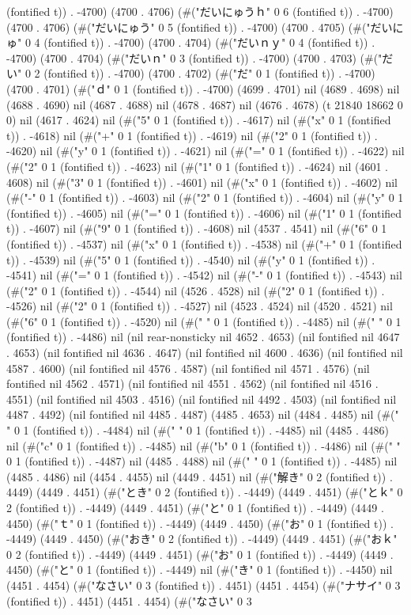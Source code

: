 (fontified t)) . -4700) (4700 . 4706) (#("だいにゅうｈ" 0 6 (fontified t)) . -4700) (4700 . 4706) (#("だいにゅう" 0 5 (fontified t)) . -4700) (4700 . 4705) (#("だいにゅ" 0 4 (fontified t)) . -4700) (4700 . 4704) (#("だいｎｙ" 0 4 (fontified t)) . -4700) (4700 . 4704) (#("だいｎ" 0 3 (fontified t)) . -4700) (4700 . 4703) (#("だい" 0 2 (fontified t)) . -4700) (4700 . 4702) (#("だ" 0 1 (fontified t)) . -4700) (4700 . 4701) (#("ｄ" 0 1 (fontified t)) . -4700) (4699 . 4701) nil (4689 . 4698) nil (4688 . 4690) nil (4687 . 4688) nil (4678 . 4687) nil (4676 . 4678) (t 21840 18662 0 0) nil (4617 . 4624) nil (#("5" 0 1 (fontified t)) . -4617) nil (#("x" 0 1 (fontified t)) . -4618) nil (#("+" 0 1 (fontified t)) . -4619) nil (#("2" 0 1 (fontified t)) . -4620) nil (#("y" 0 1 (fontified t)) . -4621) nil (#("=" 0 1 (fontified t)) . -4622) nil (#("2" 0 1 (fontified t)) . -4623) nil (#("1" 0 1 (fontified t)) . -4624) nil (4601 . 4608) nil (#("3" 0 1 (fontified t)) . -4601) nil (#("x" 0 1 (fontified t)) . -4602) nil (#("-" 0 1 (fontified t)) . -4603) nil (#("2" 0 1 (fontified t)) . -4604) nil (#("y" 0 1 (fontified t)) . -4605) nil (#("=" 0 1 (fontified t)) . -4606) nil (#("1" 0 1 (fontified t)) . -4607) nil (#("9" 0 1 (fontified t)) . -4608) nil (4537 . 4541) nil (#("6" 0 1 (fontified t)) . -4537) nil (#("x" 0 1 (fontified t)) . -4538) nil (#("+" 0 1 (fontified t)) . -4539) nil (#("5" 0 1 (fontified t)) . -4540) nil (#("y" 0 1 (fontified t)) . -4541) nil (#("=" 0 1 (fontified t)) . -4542) nil (#("-" 0 1 (fontified t)) . -4543) nil (#("2" 0 1 (fontified t)) . -4544) nil (4526 . 4528) nil (#("2" 0 1 (fontified t)) . -4526) nil (#("2" 0 1 (fontified t)) . -4527) nil (4523 . 4524) nil (4520 . 4521) nil (#("6" 0 1 (fontified t)) . -4520) nil (#(" " 0 1 (fontified t)) . -4485) nil (#(" " 0 1 (fontified t)) . -4486) nil (nil rear-nonsticky nil 4652 . 4653) (nil fontified nil 4647 . 4653) (nil fontified nil 4636 . 4647) (nil fontified nil 4600 . 4636) (nil fontified nil 4587 . 4600) (nil fontified nil 4576 . 4587) (nil fontified nil 4571 . 4576) (nil fontified nil 4562 . 4571) (nil fontified nil 4551 . 4562) (nil fontified nil 4516 . 4551) (nil fontified nil 4503 . 4516) (nil fontified nil 4492 . 4503) (nil fontified nil 4487 . 4492) (nil fontified nil 4485 . 4487) (4485 . 4653) nil (4484 . 4485) nil (#(" " 0 1 (fontified t)) . -4484) nil (#(" " 0 1 (fontified t)) . -4485) nil (4485 . 4486) nil (#("c" 0 1 (fontified t)) . -4485) nil (#("b" 0 1 (fontified t)) . -4486) nil (#(" " 0 1 (fontified t)) . -4487) nil (4485 . 4488) nil (#(" " 0 1 (fontified t)) . -4485) nil (4485 . 4486) nil (4454 . 4455) nil (4449 . 4451) nil (#("解き" 0 2 (fontified t)) . 4449) (4449 . 4451) (#("とき" 0 2 (fontified t)) . -4449) (4449 . 4451) (#("とｋ" 0 2 (fontified t)) . -4449) (4449 . 4451) (#("と" 0 1 (fontified t)) . -4449) (4449 . 4450) (#("ｔ" 0 1 (fontified t)) . -4449) (4449 . 4450) (#("お" 0 1 (fontified t)) . -4449) (4449 . 4450) (#("おき" 0 2 (fontified t)) . -4449) (4449 . 4451) (#("おｋ" 0 2 (fontified t)) . -4449) (4449 . 4451) (#("お" 0 1 (fontified t)) . -4449) (4449 . 4450) (#("と" 0 1 (fontified t)) . -4449) nil (#("き" 0 1 (fontified t)) . -4450) nil (4451 . 4454) (#("なさい" 0 3 (fontified t)) . 4451) (4451 . 4454) (#("ナサイ" 0 3 (fontified t)) . 4451) (4451 . 4454) (#("なさい" 0 3 